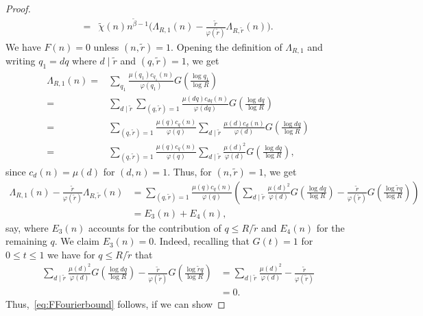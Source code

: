 \documentclass[12pt]{amsart}
\theoremstyle{definition}
\theoremstyle{remark}
\numberwithin{equation}{section}
\newcommand{\1}{\mathbf{1}}
\begin{document}
\begin{proof}
\begin{align*}
        =&\widetilde{\chi}(n) n^{\widetilde{\beta}-1} \bigl(  \Lambda_{R,1}(n)-\frac{\widetilde{r}}{\varphi(\widetilde{r})}\Lambda_{R,\widetilde{r}}(n) \bigr).
    \end{align*}
     We have $F(n)=0$ unless $(n,\widetilde{r})=1$. Opening the definition of $\Lambda_{R,1}$ and writing $q_1=dq$ where $d\mid \widetilde{r}$ and $(q,\widetilde{r})=1$, we get 
    \begin{align*}
        \Lambda_{R,1}(n)=&\sum_{q_1}\frac{\mu(q_1)c_{q_1}(n)}{\varphi(q_1)} G\left(\frac{\log q_1}{\log R}\right)\\
        =& \sum_{d\mid \widetilde{r}} \sum_{(q,\widetilde{r})=1}\frac{\mu(dq)c_{dq}(n)}{\varphi(dq)} G\left(\frac{\log dq}{\log R}\right)\\
        =&  \sum_{(q,\widetilde{r})=1} \frac{\mu(q)c_{q}(n)}{\varphi(q)}\sum_{d\mid \widetilde{r}} \frac{\mu(d)c_{d}(n)}{\varphi(d)}G\left(\frac{\log dq}{\log R}\right)\\
        =& \sum_{(q,\widetilde{r})=1} \frac{\mu(q)c_{q}(n)}{\varphi(q)}\sum_{d\mid \widetilde{r}} \frac{\mu(d)^2}{\varphi(d)}G\left(\frac{\log dq}{\log R}\right),
    \end{align*}
    since $c_d(n)=\mu(d)$ for $(d,n)=1$. Thus, for $(n,\widetilde{r})=1$, we get
    \begin{align*}
        \Lambda_{R,1}(n)-\frac{\widetilde{r}}{\varphi(\widetilde{r})}\Lambda_{R,\widetilde{r}}(n)&= \sum_{(q,\widetilde{r})=1} \frac{\mu(q)c_{q}(n)}{\varphi(q)}\left(\sum_{d\mid \widetilde{r}} \frac{\mu(d)^2}{\varphi(d)}G\left(\frac{\log dq}{\log R}\right)- \frac{\widetilde{r}}{\varphi(\widetilde{r})} G\left(\frac{\log \widetilde{r}q}{\log R}\right)\right)\\
        &=E_3(n)+E_4(n),
    \end{align*}    
    say, where $E_3(n)$ accounts for the contribution of $q \leq R/\widetilde{r}$ and $E_4(n)$ for the remaining $q$. We claim $E_3(n)=0$. Indeed, recalling that $G(t)=1$ for $0\leq t \leq 1$ we have for $q \leq R/\widetilde{r}$ that
    \begin{align*}
       \sum_{d\mid \widetilde{r}} \frac{\mu(d)^2}{\varphi(d)}G\left(\frac{\log dq}{\log R}\right)- \frac{\widetilde{r}}{\varphi(\widetilde{r})} G\left(\frac{\log \widetilde{r}q}{\log R}\right)&= \sum_{d\mid \widetilde{r}} \frac{\mu(d)^2}{\varphi(d)}-\frac{\widetilde{r}}{\varphi(\widetilde{r})}\\
       &=0.
    \end{align*}
    Thus,~\eqref{eq:FFourierbound} follows, if we can show

\end{proof}
\end{document}
